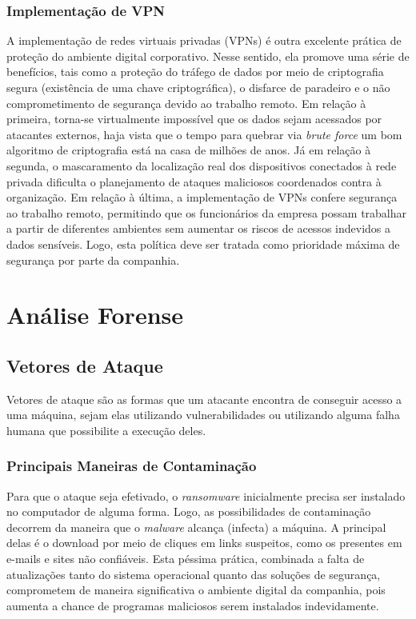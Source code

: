\documentclass[12pt]{article}
\begin{document}
\subsubsection{Implementação de VPN}
A implementação de redes virtuais privadas (VPNs) é outra excelente prática de proteção do ambiente digital corporativo. Nesse sentido, ela promove uma série de benefícios, tais como a proteção do tráfego de dados por meio de criptografia segura (existência de uma chave criptográfica), o disfarce de paradeiro e o não comprometimento de segurança devido ao trabalho remoto. Em relação à primeira, torna-se virtualmente impossível que os dados sejam acessados por atacantes externos, haja vista que o tempo para quebrar via \textit{brute force} um bom algoritmo de criptografia está na casa de milhões de anos. Já em relação à segunda, o mascaramento da localização real dos dispositivos conectados à rede privada dificulta o planejamento de ataques maliciosos coordenados contra à organização. Em relação à última, a implementação de VPNs confere segurança ao trabalho remoto, permitindo que os funcionários da empresa possam trabalhar a partir de diferentes ambientes sem aumentar os riscos de acessos indevidos a dados sensíveis. Logo, esta política deve ser tratada como prioridade máxima de segurança por parte da companhia.





\section{Análise Forense}

\subsection{Vetores de Ataque}
Vetores de ataque são as formas que um atacante encontra de conseguir acesso a uma máquina, sejam elas utilizando vulnerabilidades ou utilizando alguma falha humana que possibilite a execução deles.

\subsubsection{Principais Maneiras de Contaminação}
Para que o ataque seja efetivado, o \textit{ransomware} inicialmente precisa ser instalado no computador de alguma forma. Logo, as possibilidades de contaminação decorrem da maneira que o \textit{malware} alcança (infecta) a máquina. A principal delas é o download por meio de cliques em links suspeitos, como os presentes em e-mails e sites não confiáveis. Esta péssima prática, combinada a falta de atualizações tanto do sistema operacional quanto das soluções de segurança, comprometem de maneira significativa o ambiente digital da companhia, pois aumenta a chance de programas maliciosos serem instalados indevidamente. 
\end{document}
